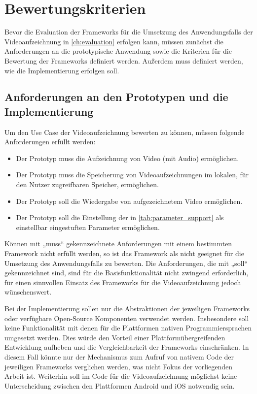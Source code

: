 \chapter{Bewertungskriterien}
\label{ch:bewertungskriterien}

Bevor die Evaluation der Frameworks für die Umsetzung des Anwendungsfalls der Videoaufzeichnung in \autoref{ch:evaluation} erfolgen kann, müssen zunächst die Anforderungen an die prototypische Anwendung sowie die Kriterien für die Bewertung der Frameworks definiert werden. 
Außerdem muss definiert werden, wie die Implementierung erfolgen soll.

\section{Anforderungen an den Prototypen und die Implementierung}
\label{sec:anforderungen}
Um den Use Case der Videoaufzeichnung bewerten zu können, müssen folgende Anforderungen erfüllt werden:
\begin{itemize}
  \item Der Prototyp muss die Aufzeichnung von Video (mit Audio) ermöglichen.
  \item Der Prototyp muss die Speicherung von Videoaufzeichnungen im lokalen, für den Nutzer zugreifbaren Speicher, ermöglichen.
  \item Der Prototyp soll die Wiedergabe von aufgezeichnetem Video ermöglichen.
  \item Der Prototyp soll die Einstellung der in \autoref{tab:parameter_support} als einstellbar eingestuften Parameter ermöglichen.
\end{itemize}

Können mit „muss“ gekennzeichnete Anforderungen mit einem bestimmten Framework nicht erfüllt werden, so ist das Framework als nicht geeignet für die Umsetzung des Anwendungsfalls zu bewerten.
Die Anforderungen, die mit „soll“ gekennzeichnet sind, sind für die Basisfunktionalität nicht zwingend erforderlich, für einen sinnvollen Einsatz des Frameworks für die Videoaufzeichnung jedoch wünschenswert.

Bei der Implementierung sollen nur die Abstraktionen der jeweiligen Frameworks oder verfügbare Open-Source Komponenten verwendet werden.
Insbesondere soll keine Funktionalität mit denen für die Plattformen nativen Programmiersprachen umgesetzt werden.
Dies würde den Vorteil einer Plattformübergreifenden Entwicklung aufheben und die Vergleichbarkeit der Frameworks einschränken.
In diesem Fall könnte nur der Mechanismus zum Aufruf von nativem Code der jeweiligen Frameworks verglichen werden, was nicht Fokus der vorliegenden Arbeit ist.
Weiterhin soll im Code für die Videoaufzeichnung möglichst keine Unterscheidung zwischen den Plattformen Android und iOS notwendig sein.


